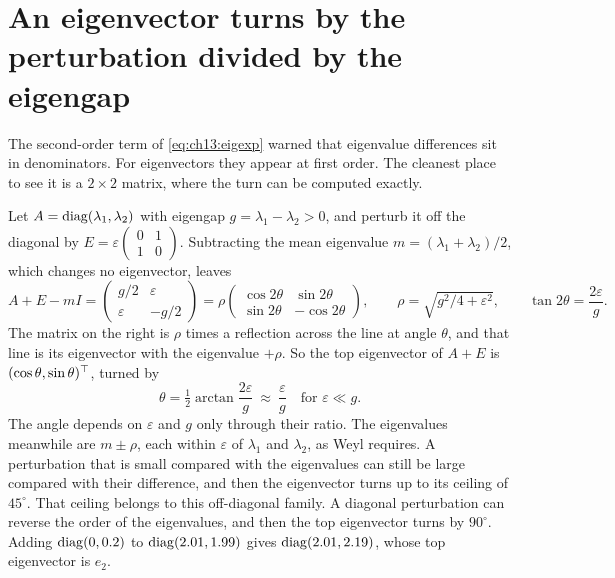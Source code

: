 \section{An eigenvector turns by the perturbation divided by the eigengap}\label{sec:ch13:turn}

The second-order term of \cref{eq:ch13:eigexp} warned that eigenvalue
differences sit in denominators. For eigenvectors they appear at first order.
The cleanest place to see it is a $2\times2$ matrix, where the turn can be
computed exactly.

Let $A=\operatorname{diag}(\lambda_1,\lambda_2)$ with eigengap $g=\lambda_1-\lambda_2>0$, and
perturb it off the diagonal by $E=\varepsilon\begin{pmatrix}0&1\\1&0\end{pmatrix}$.
Subtracting the mean eigenvalue $m=(\lambda_1+\lambda_2)/2$, which changes no
eigenvector, leaves
\begin{equation}\label{eq:ch13:rot}
A+E-mI=\begin{pmatrix}g/2&\varepsilon\\ \varepsilon&-g/2\end{pmatrix}
=\rho\begin{pmatrix}\cos2\theta&\sin2\theta\\ \sin2\theta&-\cos2\theta\end{pmatrix},
\qquad \rho=\sqrt{g^2/4+\varepsilon^2},\qquad \tan2\theta=\frac{2\varepsilon}{g}.
\end{equation}
The matrix on the right is $\rho$ times a reflection across the line at angle
$\theta$, and that line is its eigenvector with the eigenvalue $+\rho$. So the
top eigenvector of $A+E$ is $(\cos\theta,\sin\theta)^{\top}$, turned by
\begin{equation}\label{eq:ch13:theta}
\theta=\tfrac12\arctan\frac{2\varepsilon}{g}\ \approx\ \frac{\varepsilon}{g}\quad\text{for }\varepsilon\ll g .
\end{equation}
The angle depends on $\varepsilon$ and $g$ only through their ratio. The
eigenvalues meanwhile are $m\pm\rho$, each within $\varepsilon$ of
$\lambda_1$ and $\lambda_2$, as Weyl requires. A perturbation that is small
compared with the eigenvalues can still be large compared with their
difference, and then the eigenvector turns up to its ceiling of $45^\circ$. That
ceiling belongs to this off-diagonal family. A diagonal perturbation can
reverse the order of the eigenvalues, and then the top eigenvector turns by
$90^\circ$. Adding $\operatorname{diag}(0,0.2)$ to $\operatorname{diag}(2.01,1.99)$ gives $\operatorname{diag}(2.01,2.19)$,
whose top eigenvector is $e_2$.


